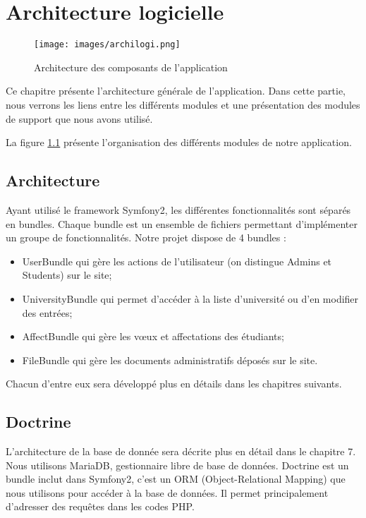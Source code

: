 \chapter{Architecture logicielle}

\begin{figure}
	\texttt{[image: images/archilogi.png]}
	\caption{Architecture des composants de l'application}
	\label{archilogi}
\end{figure}

Ce chapitre présente l'architecture générale de l'application. Dans cette partie, nous verrons les liens entre les différents modules et une présentation des modules de support que nous avons utilisé.

La figure \ref{archilogi} présente l'organisation des différents modules de notre application. 

\section{Architecture}
\bigbreak
Ayant utilisé le framework Symfony2, les différentes fonctionnalités sont séparés en bundles. Chaque bundle est un ensemble de fichiers permettant d'implémenter un groupe de fonctionnalités. Notre projet dispose de 4 bundles :
\begin{itemize}
	\item UserBundle qui gère les actions de l'utilisateur (on distingue Admins et Students) sur le site;
	\item UniversityBundle qui permet d'accéder à la liste d'université ou d'en modifier des entrées;
	\item AffectBundle qui gère les vœux et affectations des étudiants;
	\item FileBundle qui gère les documents administratifs déposés sur le site.
\end{itemize}
Chacun d'entre eux sera développé plus en détails dans les chapitres suivants.
\bigbreak
 
\section{Doctrine}

L'architecture de la base de donnée sera décrite plus en détail dans le chapitre 7. 
Nous utilisons MariaDB, gestionnaire libre de base de données.
\bigbreak
Doctrine est un bundle inclut dans Symfony2, c'est un ORM (Object-Relational Mapping) que nous utilisons pour accéder à la base de données. Il permet principalement d'adresser des requêtes dans les codes PHP.

